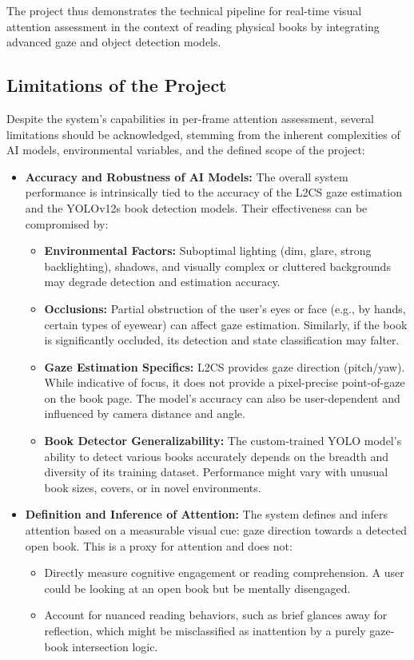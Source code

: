 The project thus demonstrates the technical pipeline for real-time visual attention assessment in the context of reading physical books by integrating advanced gaze and object detection models.

\subsection{Limitations of the Project}
Despite the system's capabilities in per-frame attention assessment, several limitations should be acknowledged, stemming from the inherent complexities of AI models, environmental variables, and the defined scope of the project:

\begin{itemize}
    \item \textbf{Accuracy and Robustness of AI Models:} The overall system performance is intrinsically tied to the accuracy of the L2CS gaze estimation and the YOLOv12s book detection models. Their effectiveness can be compromised by:
    \begin{itemize}
        \item \textbf{Environmental Factors:} Suboptimal lighting (dim, glare, strong backlighting), shadows, and visually complex or cluttered backgrounds may degrade detection and estimation accuracy.
        \item \textbf{Occlusions:} Partial obstruction of the user's eyes or face (e.g., by hands, certain types of eyewear) can affect gaze estimation. Similarly, if the book is significantly occluded, its detection and state classification may falter.
        \item \textbf{Gaze Estimation Specifics:} L2CS provides gaze direction (pitch/yaw). While indicative of focus, it does not provide a pixel-precise point-of-gaze on the book page. The model's accuracy can also be user-dependent and influenced by camera distance and angle.
        \item \textbf{Book Detector Generalizability:} The custom-trained YOLO model's ability to detect various books accurately depends on the breadth and diversity of its training dataset. Performance might vary with unusual book sizes, covers, or in novel environments.
    \end{itemize}

    \item \textbf{Definition and Inference of Attention:} The system defines and infers attention based on a measurable visual cue: gaze direction towards a detected open book. This is a proxy for attention and does not:
    \begin{itemize}
        \item Directly measure cognitive engagement or reading comprehension. A user could be looking at an open book but be mentally disengaged.
        \item Account for nuanced reading behaviors, such as brief glances away for reflection, which might be misclassified as inattention by a purely gaze-book intersection logic.
    \end{itemize}
    

\end{itemize}
